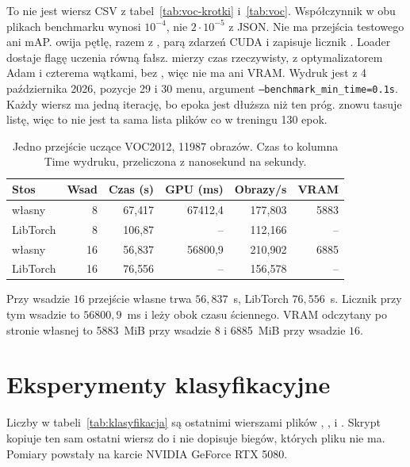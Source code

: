 To nie jest wiersz CSV z tabel~\ref{tab:voc-krotki} i~\ref{tab:voc}. Współczynnik w obu plikach benchmarku wynosi \(10^{-4}\), nie \(2\cdot 10^{-5}\) z JSON. Nie ma przejścia testowego ani mAP.  owija pętlę, razem z , parą zdarzeń CUDA i zapisuje licznik . Loader dostaje flagę uczenia równą fałsz.  mierzy czas rzeczywisty, z optymalizatorem Adam i czterema wątkami, bez , więc nie ma  ani VRAM. Wydruk jest z 4 października 2026, pozycje 29 i 30 menu, argument \texttt{--benchmark\_min\_time=0.1s}. Każdy wiersz ma jedną iterację, bo epoka jest dłuższa niż ten próg.  znowu tasuje listę, więc to nie jest ta sama lista plików co w treningu 130 epok.

\begin{table}[ht]
\centering
\caption{Jedno przejście uczące VOC2012, 11987 obrazów. Czas to kolumna Time wydruku, przeliczona z nanosekund na sekundy.}
\label{tab:bench-voc}
\small
\begin{tabular}{lrrrrr}
\toprule
Stos & Wsad & Czas (s) & GPU (ms) & Obrazy/s & VRAM \\
\midrule
własny & 8 & 67{,}417 & 67412{,}4 & 177{,}803 & 5883 \\
LibTorch & 8 & 106{,}87 & -- & 112{,}166 & -- \\
własny & 16 & 56{,}837 & 56800{,}9 & 210{,}902 & 6885 \\
LibTorch & 16 & 76{,}556 & -- & 156{,}578 & -- \\
\bottomrule
\end{tabular}
\end{table}

Przy wsadzie \(16\) przejście własne trwa \(56{,}837\)~s, LibTorch \(76{,}556\)~s. Licznik  przy tym wsadzie to \(56800{,}9\)~ms i leży obok czasu ściennego. VRAM odczytany po stronie własnej to 5883~MiB przy wsadzie \(8\) i 6885~MiB przy wsadzie \(16\).

\section{Eksperymenty klasyfikacyjne}

Liczby w tabeli~\ref{tab:klasyfikacja} są ostatnimi wierszami plików , ,  i . Skrypt  kopiuje ten sam ostatni wiersz do  i nie dopisuje biegów, których pliku nie ma. Pomiary powstały na karcie NVIDIA GeForce RTX 5080.

